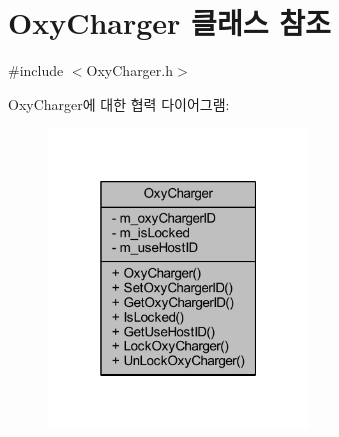 \hypertarget{class_oxy_charger}{}\section{Oxy\+Charger 클래스 참조}
\label{class_oxy_charger}


{\ttfamily \#include $<$Oxy\+Charger.\+h$>$}



Oxy\+Charger에 대한 협력 다이어그램\+:\nopagebreak
\begin{figure}[H]
\begin{center}
\leavevmode
\includegraphics[width=196pt]{class_oxy_charger__coll__graph}
\end{center}
\end{figure}
